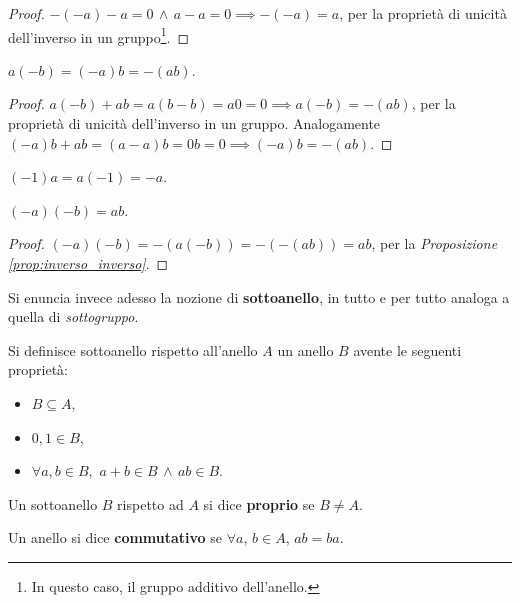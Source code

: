 \begin{proof}
    $-(-a)-a=0 \,\land\, a-a=0 \implies -(-a)=a$, per la proprietà di unicità
    dell'inverso in un gruppo\footnote{In questo caso, il gruppo additivo dell'anello.}.
\end{proof}

\begin{proposition}
    \label{prop:inverso_inverso}
    $a(-b)=(-a)b=-(ab)$.
\end{proposition}

\begin{proof}
    $a(-b)+ab=a(b-b)=a0=0 \implies a(-b)=-(ab)$, per la proprietà di unicità dell'inverso in un gruppo. Analogamente $(-a)b+ab=(a-a)b=0b=0 \implies
        (-a)b=-(ab)$.
\end{proof}

\begin{corollary}
    $(-1)a=a(-1)=-a$.
\end{corollary}

\begin{proposition}
    $(-a)(-b)=ab$.
\end{proposition}

\begin{proof}
    $(-a)(-b)=-(a(-b))=-(-(ab))=ab$, per la \textit{Proposizione \ref{prop:inverso_inverso}}.
\end{proof}

Si enuncia invece adesso la nozione di \textbf{sottoanello}, in tutto e per
tutto analoga a quella di \textit{sottogruppo}.

\begin{definition}
    Si definisce sottoanello rispetto all'anello $A$ un anello $B$ avente le
    seguenti proprietà:

    \begin{itemize}
        \item $B \subseteq A$,
        \item $0, 1 \in B$,
        \item $\forall a, b \in B,$ $a + b \in B \,\land\, ab \in B$.
    \end{itemize}
\end{definition}

\begin{definition}
    Un sottoanello $B$ rispetto ad $A$ si dice \textbf{proprio} se
    $B \neq A$.
\end{definition}

\begin{definition}
    Un anello si dice \textbf{commutativo} se $\forall a$, $b \in A$, $ab=ba$.
\end{definition}

